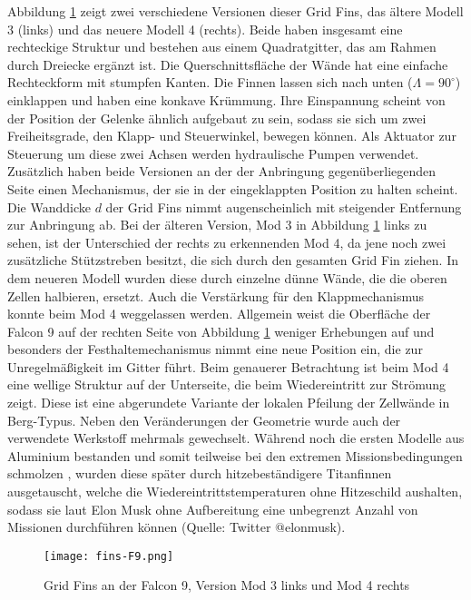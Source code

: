 Abbildung \ref{abb_finsF9} zeigt zwei verschiedene Versionen dieser Grid Fins, das ältere Modell 3 (links) und das neuere Modell 4 (rechts). Beide haben insgesamt eine rechteckige Struktur und bestehen aus einem Quadratgitter, das am Rahmen durch Dreiecke ergänzt ist. Die Querschnittsfläche der Wände hat eine einfache Rechteckform mit stumpfen Kanten. Die Finnen lassen sich nach unten ($\Lambda = 90^\circ$) einklappen und haben eine konkave Krümmung. Ihre Einspannung scheint von der Position der Gelenke ähnlich aufgebaut zu sein, sodass sie sich um zwei Freiheitsgrade, den Klapp- und Steuerwinkel, bewegen können. Als Aktuator zur Steuerung um diese zwei Achsen werden hydraulische Pumpen verwendet. Zusätzlich haben beide Versionen an der der Anbringung gegenüberliegenden Seite einen Mechanismus, der sie in der eingeklappten Position zu halten scheint. Die Wanddicke $d$ der Grid Fins nimmt augenscheinlich mit steigender Entfernung zur Anbringung ab. Bei der älteren Version, Mod 3 in Abbildung \ref{abb_finsF9} links zu sehen, ist der Unterschied der rechts zu erkennenden Mod 4, da jene noch zwei zusätzliche Stützstreben besitzt, die sich durch den gesamten Grid Fin ziehen. In dem neueren Modell wurden diese durch einzelne dünne Wände, die die oberen Zellen halbieren, ersetzt. Auch die Verstärkung für den Klappmechanismus konnte beim Mod 4 weggelassen werden. Allgemein weist die Oberfläche der Falcon 9 auf der rechten Seite von Abbildung \ref{abb_finsF9} weniger Erhebungen auf und besonders der Festhaltemechanismus nimmt eine neue Position ein, die zur Unregelmäßigkeit im Gitter führt. Beim genauerer Betrachtung ist beim Mod 4 eine wellige Struktur auf der Unterseite, die beim Wiedereintritt zur Strömung zeigt. Diese ist eine abgerundete Variante der lokalen Pfeilung der Zellwände in Berg-Typus. Neben den Veränderungen der Geometrie wurde auch der verwendete Werkstoff mehrmals gewechselt. Während noch die ersten Modelle aus Aluminium bestanden und somit teilweise bei den extremen Missionsbedingungen schmolzen \cite{titanium}, wurden diese später durch hitzebeständigere Titanfinnen ausgetauscht, welche die Wiedereintrittstemperaturen ohne Hitzeschild aushalten, sodass sie laut Elon Musk ohne Aufbereitung eine unbegrenzt Anzahl von Missionen durchführen können (Quelle: Twitter @elonmusk).
\begin{figure}[h]
	\centering
	\texttt{[image: fins-F9.png]}
	\begin{flushright}
	\end{flushright}
	\caption{Grid Fins an der Falcon 9, Version Mod 3 links und Mod 4 rechts}
	\label{abb_finsF9}
\end{figure}\\
